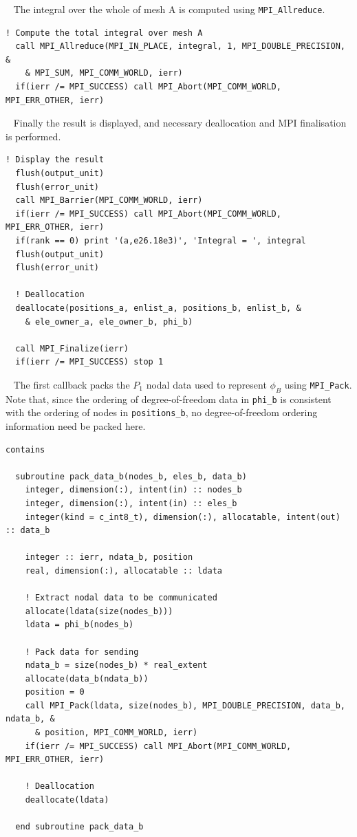 \documentclass{article}
\begin{document}
~\newline
The integral over the whole of mesh A is computed using \verb+MPI_Allreduce+.
\begin{lstlisting}[language=FORTRAN]  
  ! Compute the total integral over mesh A
  call MPI_Allreduce(MPI_IN_PLACE, integral, 1, MPI_DOUBLE_PRECISION, &
    & MPI_SUM, MPI_COMM_WORLD, ierr)
  if(ierr /= MPI_SUCCESS) call MPI_Abort(MPI_COMM_WORLD, MPI_ERR_OTHER, ierr)
\end{lstlisting}

~\newline
Finally the result is displayed, and necessary deallocation and MPI finalisation
is performed.
\begin{lstlisting}[language=FORTRAN]  
  ! Display the result
  flush(output_unit)
  flush(error_unit)
  call MPI_Barrier(MPI_COMM_WORLD, ierr)
  if(ierr /= MPI_SUCCESS) call MPI_Abort(MPI_COMM_WORLD, MPI_ERR_OTHER, ierr)
  if(rank == 0) print '(a,e26.18e3)', 'Integral = ', integral
  flush(output_unit)
  flush(error_unit)
      
  ! Deallocation
  deallocate(positions_a, enlist_a, positions_b, enlist_b, &
    & ele_owner_a, ele_owner_b, phi_b)
  
  call MPI_Finalize(ierr)
  if(ierr /= MPI_SUCCESS) stop 1
\end{lstlisting}

~\newline
The first callback packs the $P_1$ nodal data used to represent $\phi_B$ using
\verb+MPI_Pack+. Note that, since the ordering of degree-of-freedom data in
\verb+phi_b+ is consistent with the ordering of nodes in \verb+positions_b+, no
degree-of-freedom ordering information need be packed
here.
\begin{lstlisting}[language=FORTRAN]  
contains

  subroutine pack_data_b(nodes_b, eles_b, data_b)
    integer, dimension(:), intent(in) :: nodes_b
    integer, dimension(:), intent(in) :: eles_b
    integer(kind = c_int8_t), dimension(:), allocatable, intent(out) :: data_b

    integer :: ierr, ndata_b, position
    real, dimension(:), allocatable :: ldata

    ! Extract nodal data to be communicated
    allocate(ldata(size(nodes_b)))
    ldata = phi_b(nodes_b)

    ! Pack data for sending
    ndata_b = size(nodes_b) * real_extent
    allocate(data_b(ndata_b))
    position = 0
    call MPI_Pack(ldata, size(nodes_b), MPI_DOUBLE_PRECISION, data_b, ndata_b, &
      & position, MPI_COMM_WORLD, ierr)
    if(ierr /= MPI_SUCCESS) call MPI_Abort(MPI_COMM_WORLD, MPI_ERR_OTHER, ierr)

    ! Deallocation
    deallocate(ldata)
    
  end subroutine pack_data_b
\end{lstlisting}
\end{document}
